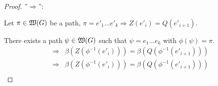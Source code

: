 \begin{proof}
''$\Rightarrow$'':

Let $\pi \in \mbox{$\mathfrak{W}({G})$}$ be a path, $\pi = e'_1 \ldots e'_k \Rightarrow Z(e'_i)
= Q(e'_{i+1})$.

There exists a path $\psi \in \mbox{$\mathfrak{W}({G})$}$ such that $\psi = e_1 \ldots e_k$
with $\phi(\psi) = \pi$.
\begin{eqnarray*}
&\Rightarrow& \beta(Z(\phi^{-1}(e'_i))) = \beta(Q(\phi^{-1}(e'_{i+1}))) \\
&\Rightarrow& \beta(Z(\phi^{-1}(e'_i))) = \beta(Q(\phi^{-1}(e'_{i+1}))) \\
\end{eqnarray*}
\end{proof}






















